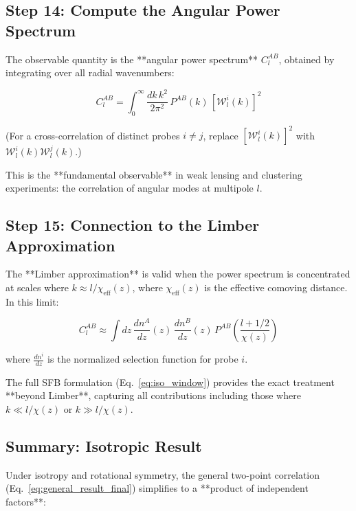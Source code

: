 \subsection{Step 14: Compute the Angular Power Spectrum}

The observable quantity is the **angular power spectrum** $C_l^{AB}$, obtained by integrating over all radial wavenumbers:

\begin{equation}
    C_l^{AB} = \int_0^{\infty} \frac{dk \, k^2}{2\pi^2} \, P^{AB}(k) \, \left[\mathcal{W}_l^i(k)\right]^2
\label{eq:cl_def}
\end{equation}

(For a cross-correlation of distinct probes $i \neq j$, replace $\left[\mathcal{W}_l^i(k)\right]^2$ with $\mathcal{W}_l^i(k) \mathcal{W}_l^j(k)$.)

This is the **fundamental observable** in weak lensing and clustering experiments: the correlation of angular modes at multipole $l$.

\subsection{Step 15: Connection to the Limber Approximation}

The **Limber approximation** is valid when the power spectrum is concentrated at scales where $k \approx l/\chi_{\mathrm{eff}}(z)$, where $\chi_{\mathrm{eff}}(z)$ is the effective comoving distance. In this limit:

\begin{equation}
    C_l^{AB} \approx \int dz \, \frac{dn^A}{dz}(z) \, \frac{dn^B}{dz}(z) \, P^{AB}\left(\frac{l + 1/2}{\chi(z)}\right)
\label{eq:limber_approx}
\end{equation}

where $\frac{dn^i}{dz}$ is the normalized selection function for probe $i$.

The full SFB formulation (Eq.~\ref{eq:iso_window}) provides the exact treatment **beyond Limber**, capturing all contributions including those where $k \ll l/\chi(z)$ or $k \gg l/\chi(z)$.

\subsection{Summary: Isotropic Result}

Under isotropy and rotational symmetry, the general two-point correlation (Eq.~\ref{eq:general_result_final}) simplifies to a **product of independent factors**:


